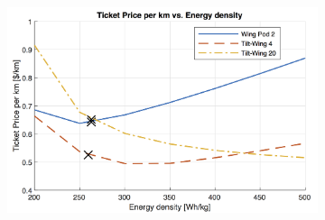 \begin{figure}[H]
\begin{subfigure}[t]{0.33\textwidth}
    \label{fig:sens5}
\end{subfigure}
\begin{subfigure}[t]{0.33\textwidth}
    \centering
    \includegraphics[width=\textwidth]{Figures/Edens_TPrice_perkmNOPAD.png}
    \captionsetup{justification=centering}
    \caption{}
    \label{fig:sens6}
\end{subfigure}
\captionsetup{justification=centering}
\caption{}
\label{fig:sens456}
\end{figure}

